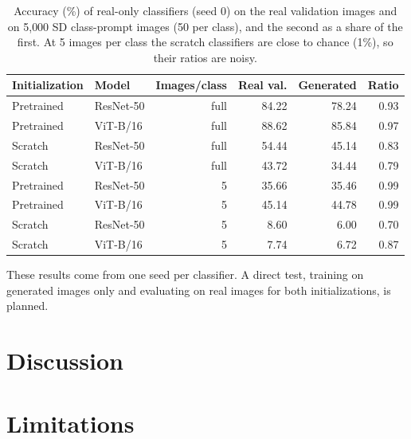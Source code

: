 \documentclass{scrartcl}
\begin{document}
\begin{table}[H]
\centering
\small
\caption{Accuracy (\%) of real-only classifiers (seed 0) on the real validation images and on 5{,}000 SD
class-prompt images (50 per class), and the second as a share of the first. At 5 images per class the
scratch classifiers are close to chance (1\%), so their ratios are noisy.}
\label{tab:synthetic-accuracy}
\begin{tabular}{llrrrr}
\toprule
Initialization & Model & Images/class & Real val. & Generated & Ratio \\
\midrule
Pretrained & ResNet-50 & full & 84.22 & 78.24 & 0.93 \\
Pretrained & ViT-B/16  & full & 88.62 & 85.84 & 0.97 \\
Scratch    & ResNet-50 & full & 54.44 & 45.14 & 0.83 \\
Scratch    & ViT-B/16  & full & 43.72 & 34.44 & 0.79 \\
\midrule
Pretrained & ResNet-50 & 5 & 35.66 & 35.46 & 0.99 \\
Pretrained & ViT-B/16  & 5 & 45.14 & 44.78 & 0.99 \\
Scratch    & ResNet-50 & 5 & 8.60  & 6.00  & 0.70 \\
Scratch    & ViT-B/16  & 5 & 7.74  & 6.72  & 0.87 \\
\bottomrule
\end{tabular}
\end{table}

These results come from one seed per classifier. A direct test, training on generated images only and
evaluating on real images for both initializations, is planned.

\section{Discussion}


\section{Limitations}

\end{document}

